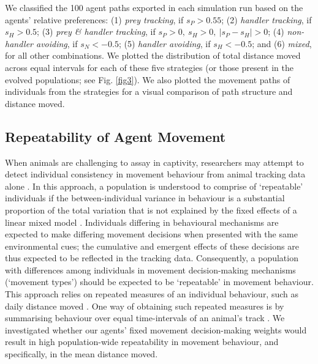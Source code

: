 We classified the 100 agent paths exported in each simulation run based on the agents' relative preferences: (1) \textit{prey tracking}, if $s_P > 0.55$; (2) \textit{handler tracking}, if $s_H > 0.5$; (3) \textit{prey \& handler tracking}, if $s_P > 0,~s_H > 0,~|s_P - s_H| > 0$; (4) \textit{non-handler avoiding}, if $s_N < -0.5$; (5) \textit{handler avoiding}, if $s_H < -0.5$; and (6) \textit{mixed}, for all other combinations.
We plotted the distribution of total distance moved across equal intervals for each of these five strategies (or those present in the evolved populations; see Fig. \ref{fig3}).
We also plotted the movement paths of individuals from the strategies for a visual comparison of path structure and distance moved.

\subsection*{Repeatability of Agent Movement}

When animals are challenging to assay in captivity, researchers may attempt to detect individual consistency in movement behaviour from animal tracking data alone \citep[see a review in][see \citealt{hertel2019} for an example]{hertel2020}.
In this approach, a population is understood to comprise of `repeatable' individuals if the between-individual variance in behaviour is a substantial proportion of the total variation that is not explained by the fixed effects of a linear mixed model \citep[LMM][]{hertel2019}.
Individuals differing in behavioural mechanisms are expected to make differing movement decisions when presented with the same environmental cues; the cumulative and emergent effects of these decisions are thus expected to be reflected in the tracking data.
Consequently, a population with differences among individuals in movement decision-making mechanisms (`movement types') should be expected to be `repeatable' in movement behaviour.
This approach relies on repeated measures of an individual behaviour, such as daily distance moved \citep[][]{niemela2018, hertel2020}.
One way of obtaining such repeated measures is by summarising behaviour over equal time-intervals of an animal's track \citep[see e.g.][]{hertel2019}.
We investigated whether our agents' fixed movement decision-making weights would result in high population-wide repeatability in movement behaviour, and specifically, in the mean distance moved.

